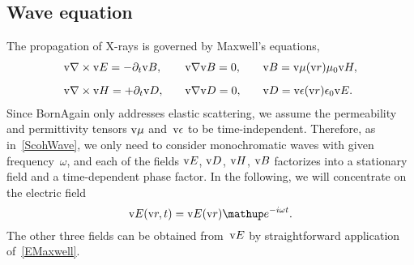 \subsection{Wave equation}\label{SXwave}

The propagation of X-rays is governed by Maxwell's equations,
%
%
\begin{equation}\label{EMaxwell}
  \begin{array}{lll}
    \text{v}{\nabla}\times\text{v}{E}=-\partial_t \text{v}{B},\quad
   &\text{v}{\nabla}\text{v}{B}=0,\quad
   &\text{v}{B}=\text{v}{\mu}(\text{v}{r})\mu_0\text{v}{H},
   \\[2ex]
    \text{v}{\nabla}\times\text{v}{H}=+\partial_t \text{v}{D},\quad
   &\text{v}{\nabla}\text{v}{D}=0,\quad
   &\text{v}{D}=\text{v}{\epsilon}(\text{v}{r})\epsilon_0\text{v}{E}.
  \end{array}
\end{equation}
%
%
%
%
%
%
%
%
Since BornAgain only addresses elastic scattering,
%
%
we assume the permeability and permittivity tensors $\text{v}\mu$ and~$\text{v}\epsilon$
to be time-independent.
%
Therefore, as in~\cref{ScohWave}, we only need to consider monochromatic waves
%
%
with given frequency~$\omega$,
and each of the fields $\text{v}{E}$, $\text{v}{D}$, $\text{v}{H}$, $\text{v}{B}$
factorizes into a stationary field and a time-dependent phase factor.
%
In the following, we will concentrate on the electric field
%
\begin{equation}
  \v{E}(\r,t) = \v{E}(\r)\e^{-i\omega t}.
\end{equation}
The other three fields can be obtained from~$\text{v}{E}$
by straightforward application of~\cref{EMaxwell}.

